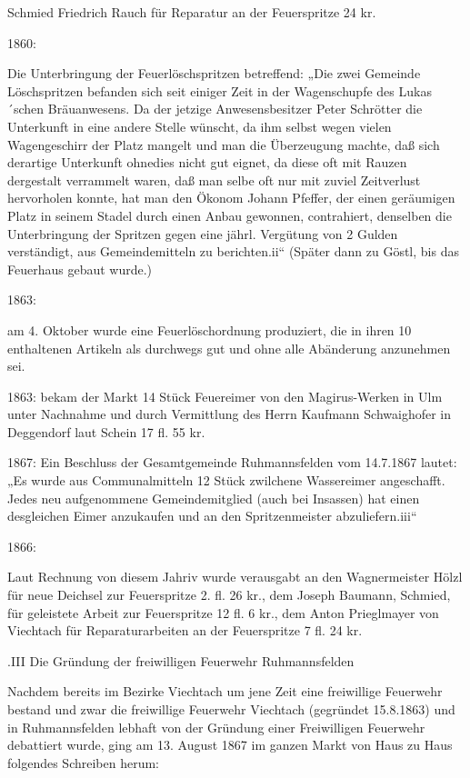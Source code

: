 \documentclass[12pt,a4pager]{book}
\begin{document}
Schmied Friedrich Rauch für Reparatur an der Feuerspritze 24 kr.

1860:

Die Unterbringung der Feuerlöschspritzen betreffend: „Die zwei Gemeinde
Löschspritzen befanden sich seit einiger Zeit in der Wagenschupfe des
Lukas´schen Bräuanwesens. Da der jetzige Anwesensbesitzer Peter Schrötter die
Unterkunft in eine andere Stelle wünscht, da ihm selbst wegen vielen
Wagengeschirr der Platz mangelt und man die Überzeugung machte, daß sich
derartige Unterkunft ohnedies nicht gut eignet, da diese oft mit Rauzen
dergestalt verrammelt waren, daß man selbe oft nur mit zuviel Zeitverlust
hervorholen konnte, hat man den Ökonom Johann Pfeffer, der einen geräumigen
Platz in seinem Stadel durch einen Anbau gewonnen, contrahiert, denselben die
Unterbringung der Spritzen gegen eine jährl. Vergütung von 2 Gulden verständigt,
aus Gemeindemitteln zu berichten.ii“ (Später dann zu Göstl, bis das Feuerhaus
gebaut wurde.)

1863:

am 4. Oktober wurde eine Feuerlöschordnung produziert, die in ihren 10
enthaltenen Artikeln als durchwegs gut und ohne alle Abänderung anzunehmen sei.

1863:   bekam der Markt 14 Stück Feuereimer von den Magirus-Werken in Ulm unter
Nachnahme und durch Vermittlung des Herrn Kaufmann Schwaighofer in Deggendorf
laut Schein 17 fl. 55 kr.

1867:   Ein Beschluss der Gesamtgemeinde Ruhmannsfelden vom 14.7.1867 lautet:
„Es wurde aus Communalmitteln 12 Stück zwilchene Wassereimer angeschafft. Jedes
neu aufgenommene Gemeindemitglied (auch bei Insassen) hat einen desgleichen
Eimer anzukaufen und an den Spritzenmeister abzuliefern.iii“

1866:

Laut Rechnung von diesem Jahriv wurde verausgabt an den Wagnermeister Hölzl für
neue Deichsel zur Feuerspritze 2. fl. 26 kr., dem Joseph Baumann, Schmied, für
geleistete Arbeit zur Feuerspritze 12 fl. 6 kr., dem Anton Prieglmayer von
Viechtach für Reparaturarbeiten an der Feuerspritze 7 fl. 24 kr.

.III Die Gründung der freiwilligen Feuerwehr Ruhmannsfelden

Nachdem bereits im Bezirke Viechtach um jene Zeit eine freiwillige Feuerwehr
bestand und zwar die freiwillige Feuerwehr Viechtach (gegründet 15.8.1863) und
in Ruhmannsfelden lebhaft von der Gründung einer Freiwilligen Feuerwehr
debattiert wurde, ging am 13. August 1867 im ganzen Markt von Haus zu Haus
folgendes Schreiben herum:
\end{document}
